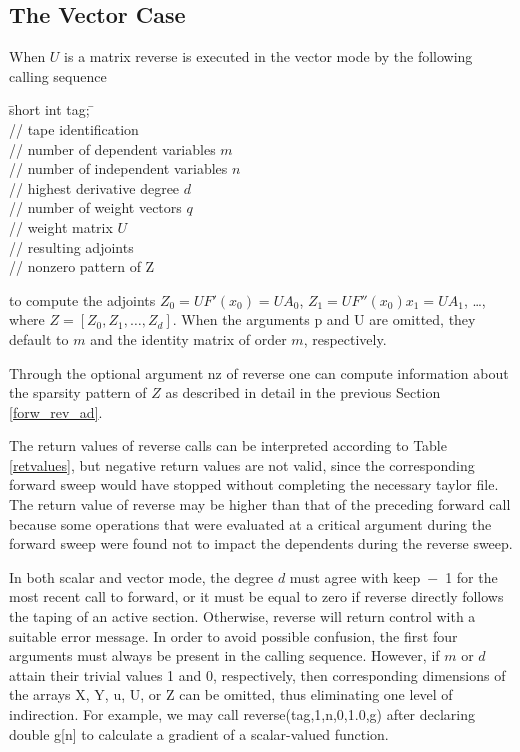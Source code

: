\documentclass[11pt,twoside]{article}
\begin{document}
\subsection{The Vector Case}
%
\label{vecCas}
%
When $U$ is a matrix {\sf reverse} is executed in the vector mode by the following calling sequence
%
\begin{tabbing}
\hspace{0.5in}\={\sf short int tag;} \hspace{1.1in}\= \kill    %
\\
         \> // tape identification \\
                 \> // number of dependent variables $m$\\
                 \> // number of independent variables $n$\\
                \> // highest derivative degree $d$\\ 
                 \> // number of weight vectors $q$\\
        \> // weight matrix $U$\\
   \> // resulting adjoints \\
        \> // nonzero pattern of {\sf Z}
\end{tabbing}
%
to compute the adjoints $Z_0=U F'(x_0)=U A_0$, $Z_1=U F''(x_0)x_1=U A_1$, 
\ldots, where $Z=[Z_0,Z_1,\ldots,Z_d]$.
When the arguments {\sf p} and {\sf U} are omitted, they default to 
$m$ and the identity matrix of order $m$, respectively.  

Through the optional argument {\sf nz} of {\sf reverse} one can compute
information about the sparsity pattern of $Z$ as described in detail
in the previous Section \ref{forw_rev_ad}.

The return values of {\sf reverse} calls can be interpreted according
to Table \ref{retvalues}, but negative return values are not
valid, since the corresponding forward sweep would have
stopped without completing the necessary taylor file. 
The return value of {\sf reverse} may be higher 
than that of the preceding {\sf forward} call because some operations 
that were evaluated  at a critical argument during the forward sweep
were found not to impact the dependents during the reverse sweep.

In both scalar and vector mode, the degree $d$ must agree with
{\sf keep}~$-$~1 for the most recent call to {\sf forward}, or it must be
equal to zero if {\sf reverse} directly follows the taping of an active
section. Otherwise, {\sf reverse} will return control with a suitable error
message. 
In order to avoid possible confusion, the first four arguments must always be
present in the calling sequence. However, if $m$ or $d$
attain their trivial values 1 and 0, respectively, then
corresponding dimensions of the arrays {\sf X}, {\sf Y}, {\sf u},
{\sf U}, or {\sf Z} can be omitted, thus eliminating one level of
indirection.  For example, we may call
{\sf reverse(tag,1,n,0,1.0,g)} after declaring
{\sf double g[n]} 
to calculate a gradient of a scalar-valued function.
\end{document}
